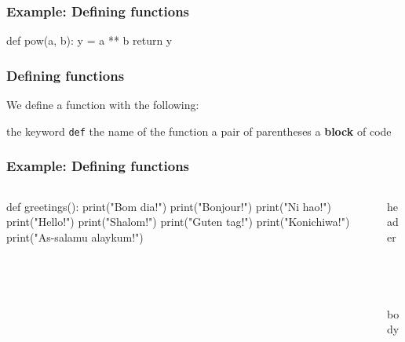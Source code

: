 \documentclass[11pt]{beamer}
\begin{document}
\begin{frame}[fragile]
  \frametitle{Example:  Defining functions}
  \Enlarge

  \begin{semiverbatim}
def pow(a, b):
    y = a ** b
    return y
  \end{semiverbatim}
\end{frame}

\begin{frame}[fragile]
  \frametitle{Defining functions}
  \Enlarge

  \begin{itemize}
  \myitem  We define a function with the following:
    \begin{itemize}
    \mysubitem  the keyword \texttt{def}
    \mysubitem  the name of the function
    \mysubitem  a pair of parentheses
    \mysubitem  a \textbf{block} of code
    \end{itemize}
  \end{itemize}
\end{frame}

\begin{frame}[fragile]
  \frametitle{Example:  Defining functions}
  \Enlarge

  \begin{columns}
  \begin{column}{0.75\textwidth}
\begin{semiverbatim}
def greetings():
    print("Bom dia!")
    print("Bonjour!")
    print("Ni hao!")
    print("Hello!")
    print("Shalom!")
    print("Guten tag!")
    print("Konichiwa!")
    print("As-salamu alaykum!")
\end{semiverbatim}
  \end{column}
  \begin{column}{0.25\textwidth}
    header \\ ~ \\ ~ \\ ~ \\ ~ body \\ ~ \\ ~ \\ ~ \\ ~ \\
  \end{column}
  \end{columns}
\end{frame}
\end{document}

